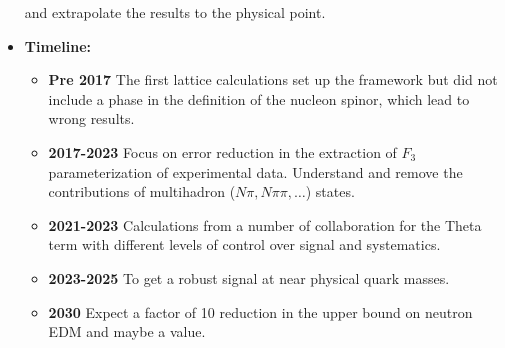 \documentclass[12pt,hyperpdf]{article}
\begin{document}
\begin{itemize}
      and extrapolate the results to the physical point.
\item{\bf Timeline:}
\begin{itemize}
    \item{\bf Pre 2017} The first lattice calculations set up the
      framework but did not include a phase in the definition of the
      nucleon spinor, which lead to wrong results.  
    \item{\bf 2017-2023} Focus on error reduction in the extraction of
      $F_3$ parameterization of experimental data. Understand and remove 
      the contributions of multihadron ($N\pi,
      N\pi\pi, \ldots$) states. 
    \item{\bf 2021-2023} Calculations from a number of collaboration for
      the Theta term with different levels of control over signal and
      systematics.  
    \item{\bf 2023-2025} To get a robust signal at near physical quark masses. 
    \item{\bf 2030} Expect a factor of 10 reduction in the upper bound on
      neutron EDM and maybe a value.  
\end{itemize}
\end{itemize}

\end{document}
